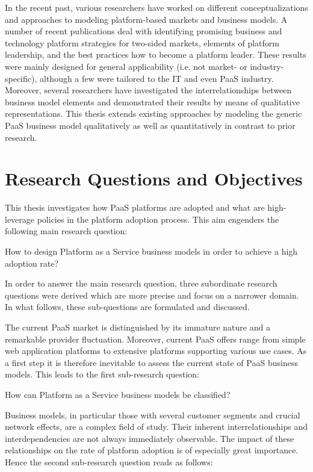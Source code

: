 In the recent past, various researchers have worked on different conceptualizations and approaches to modeling platform-based markets and business models. A number of recent publications deal with identifying promising business and technology platform strategies for two-sided markets, elements of platform leadership, and the best practices how to become a platform leader. These results were mainly designed for general applicability (i.e. not market- or industry-specific), although a few were tailored to the \ac{IT} and even \ac{PaaS} industry. Moreover, several researchers have investigated the interrelationships between business model elements and demonstrated their results by means of qualitative representations. This thesis extends existing approaches by modeling the generic \ac{PaaS} business model qualitatively  as well as quantitatively in contrast to prior research.

\section{Research Questions and Objectives}\label{ch:intro:rq}

This thesis investigates how \ac{PaaS} platforms are adopted and what are high-leverage policies in the platform adoption process. This aim engenders the following main research question:

\begin{MRQ}\label{mrq}
How to design Platform as a Service business models in order to achieve a high adoption rate?
\end{MRQ}

In order to answer the main research question, three subordinate research questions were derived which are more precise and focus on a narrower domain. In what follows, these sub-questions are formulated and discussed.

The current \ac{PaaS} market is distinguished by its immature nature and a remarkable provider fluctuation. Moreover, current \ac{PaaS} offers range from simple web application platforms to extensive platforms supporting various use cases. As a first step it is therefore inevitable to assess the current state of \ac{PaaS} business models. This leads to the first sub-research question:

\begin{SRQ}\label{srq1}
How can Platform as a Service business models be classified?
\end{SRQ}

Business models, in particular those with several customer segments and crucial network effects, are a complex field of study. Their inherent interrelationships and interdependencies are not always immediately observable. The impact of these relationships on the rate of platform adoption is of especially great importance. Hence the second sub-research question reads as follows:

